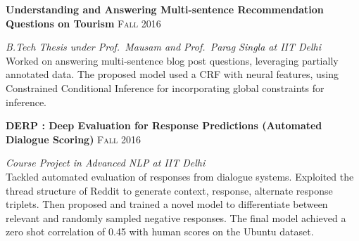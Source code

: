 \headedsection
  {\textbf{Understanding and Answering Multi-sentence Recommendation Questions on Tourism}}
  {\textsc{Fall 2016}} {%
  
    {
    \emph{B.Tech Thesis under Prof.\ Mausam and Prof.\ Parag Singla at IIT Delhi} \\
    Worked on answering multi-sentence blog post questions, leveraging partially annotated data. The proposed model used a CRF with neural features, using Constrained Conditional Inference for incorporating global constraints for inference.
    }
}
\headedsection
  {\textbf{DERP : Deep Evaluation for Response Predictions (Automated Dialogue Scoring)}}
  {\textsc{Fall 2016}} {%
  
    {
    \emph{Course Project in Advanced NLP at IIT Delhi} \\
        Tackled automated evaluation of responses from dialogue systems. Exploited the thread structure of Reddit to generate context, response, alternate response triplets. Then proposed and trained a novel model to differentiate between relevant and randomly sampled negative responses. The final model achieved a zero shot correlation of 0.45 with human scores on the Ubuntu dataset.
    }
  }